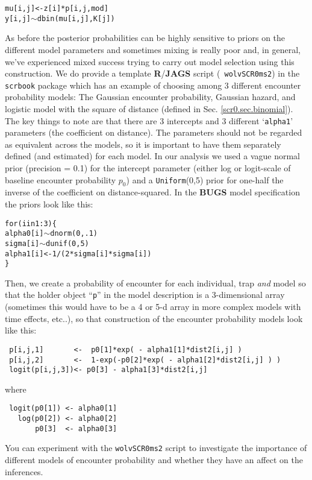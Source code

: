 {{\begin{alltt}
  mu[i,j] <- z[i]*p[i,j,mod]
  y[i,j] \(\sim\) dbin(mu[i,j],K[j])
\end{alltt}
}


As before the posterior probabilities can be highly sensitive to
priors on the different model parameters and sometimes mixing is
really poor and, in general, we've experienced mixed success trying to
carry out model selection using this construction.
We do provide a template {\bf R}/{\bf JAGS} script (\mbox{\tt
  wolvSCR0ms2}) in the \mbox{\tt scrbook} package which has an
example of choosing among 3 different encounter probability
models:
The Gaussian encounter probability, Gaussian hazard, and logistic
model with the square of distance (defined in Sec. \ref{scr0.sec.binomial}). The key things to note are that
there are 3 intercepts and 3 different `\mbox{\tt alpha1}' parameters
(the coefficient on distance). The parameters should not be regarded
as equivalent across the models, so it is important to have them
separately defined (and estimated) for each model.  In our analysis we
used a vague normal prior (precision = 0.1) for the intercept
parameter (either log or logit-scale of baseline encounter probability
$p_{0}$) and a \mbox{\tt Uniform}(0,5) prior for one-half the inverse of the
coefficient on distance-squared.
In the {\bf BUGS} model specification the priors look like this:
\begin{alltt}
 for(i in 1:3)\{
   alpha0[i] \(\sim\) dnorm(0,.1)
   sigma[i] \(\sim\) dunif(0,5)
   alpha1[i] <- 1/(2*sigma[i]*sigma[i])
 \}
\end{alltt}
Then,  we create a probability of encounter for each
individual, trap {\it and} model so that the holder object ``\mbox{\tt p}'' in the
model description is a 3-dimensional array (sometimes this would have to be a 4
or 5-d array in more complex models with time effects, etc..), so that
construction of the encounter probability models look like this:
\begin{verbatim}
 p[i,j,1]       <-  p0[1]*exp( - alpha1[1]*dist2[i,j] )
 p[i,j,2]       <-  1-exp(-p0[2]*exp( - alpha1[2]*dist2[i,j] ) )
 logit(p[i,j,3])<- p0[3] - alpha1[3]*dist2[i,j]
\end{verbatim}
where
\begin{verbatim}
 logit(p0[1]) <- alpha0[1]
   log(p0[2]) <- alpha0[2]
       p0[3]  <- alpha0[3]
\end{verbatim}
You can experiment with the \mbox{\tt wolvSCR0ms2} script to
investigate the importance of different models of encounter
probability and whether they have an affect on the inferences.









}
